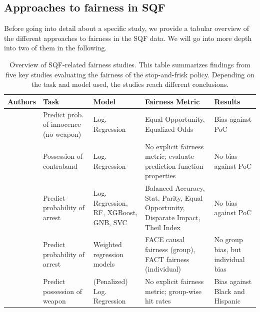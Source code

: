



\subsection{Approaches to fairness in SQF}

Before going into detail about a specific study, we provide a tabular overview of the different approaches to fairness in the SQF data. We will go into more depth into two of them in the following.

\begin{table}[h]
    \centering
        \begin{tabular}{|m{2cm}|m{3cm}|m{2.5cm}|m{3.5cm}|m{2.8cm}|}
            \hline
            \textbf{Authors} & \textbf{Task} & \textbf{Model} & \textbf{Fairness Metric} & \textbf{Results} \\
            \hline
            \cite{kallus2018} 
            & Predict prob. of innocence (no weapon) 
            & Log. Regression 
            & Equal Opportunity, Equalized Odds 
            & Bias against PoC \\ 
            \hline
            \cite{rambachan2016} 
            & Possession of contraband
            & Log. Regression 
            & No explicit fairness metric; evaluate prediction function properties 
            & No bias against PoC\\
            \hline
            \cite{Badr2022DTFANSP} 
            & Predict probability of arrest 
            & Log. Regression, RF, XGBoost, GNB, SVC 
            & Balanced Accuracy, Stat. Parity, Equal Opportunity, Disparate Impact, Theil Index 
            & No bias against PoC \\ 
            \hline
            \cite{Khademi2019FADMELC} 
            & Predict probability of arrest 
            & Weighted regression models
            & FACE causal fairness (group), FACT fairness (individual) 
            & No group bias, but individual bias \\ 
            \hline
            \cite{goel2016} 
            & Predict possession of weapon 
            & (Penalized) Log. Regression 
            & No explicit fairness metric; group-wise hit rates 
            & Bias against Black and Hispanic\\ 
            \hline
        \end{tabular}
        \caption{Overview of SQF-related fairness studies. This table summarizes findings from five key studies evaluating the fairness of the stop-and-frisk policy. Depending on the task and model used, the studies reach different conclusions.}
        \label{tab:sqf_summary}
\end{table}

